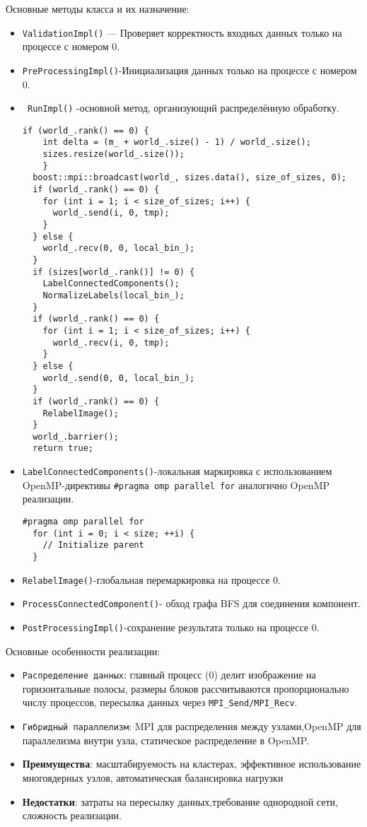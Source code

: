 \documentclass[12pt]{extarticle}
\begin{document}
Основные методы класса и их назначение:
\begin{itemize}
    \item \texttt{ValidationImpl()} — Проверяет корректность входных данных только на процессе с номером 0.
    \item \texttt{PreProcessingImpl()}-Инициализация данных только на процессе с номером 0.
     \item \texttt{ RunImpl()} -основной метод, организующий распределённую обработку.
      \begin{lstlisting}[caption={Распределенная обработка изображения},label={all14}]
     if (world_.rank() == 0) {
    int delta = (m_ + world_.size() - 1) / world_.size();
    sizes.resize(world_.size());
    }
  boost::mpi::broadcast(world_, sizes.data(), size_of_sizes, 0);
  if (world_.rank() == 0) {
    for (int i = 1; i < size_of_sizes; i++) {
      world_.send(i, 0, tmp);  
    }
  } else {
    world_.recv(0, 0, local_bin_);
  }
  if (sizes[world_.rank()] != 0) {
    LabelConnectedComponents();  
    NormalizeLabels(local_bin_); 
  }
  if (world_.rank() == 0) {
    for (int i = 1; i < size_of_sizes; i++) {
      world_.recv(i, 0, tmp);
    }
  } else {
    world_.send(0, 0, local_bin_);
  }
  if (world_.rank() == 0) {
    RelabelImage(); 
  }
  world_.barrier();
  return true;
 \end{lstlisting}
  \item \texttt{LabelConnectedComponents()}-локальная маркировка с использованием OpenMP-директивы  \texttt{\#pragma omp parallel for} аналогично  OpenMP реализации.
  \begin{lstlisting}[caption={локальная маркировка с использованием OpenMP},label={all15}]
  #pragma omp parallel for
  for (int i = 0; i < size; ++i) {
    // Initialize parent
  }
  \end{lstlisting}
  \item\texttt{RelabelImage()}-глобальная перемаркировка на процессе 0.
  \item\texttt{ProcessConnectedComponent()}- обход графа BFS для соединения компонент.
  \item\texttt{PostProcessingImpl()}-сохранение результата только на процессе 0.
\end{itemize}

Основные особенности реализации:
\begin{itemize}
    \item\texttt{Распределение данных}: главный процесс (0) делит изображение на горизонтальные полосы, размеры блоков рассчитываются пропорционально числу процессов, пересылка данных через \texttt{MPI\_Send/MPI\_Recv}.
     \item\texttt{Гибридный параллелизм}: MPI для распределения между узлами,OpenMP для параллелизма внутри узла, статическое распределение в OpenMP.
    \item \textbf{Преимущества}: масштабируемость на кластерах, эффективное использование многоядерных узлов, автоматическая балансировка нагрузки
    \item \textbf{Недостатки}: затраты на пересылку данных,требование однородной сети, сложность реализации.
\end{itemize}
\end{document}
